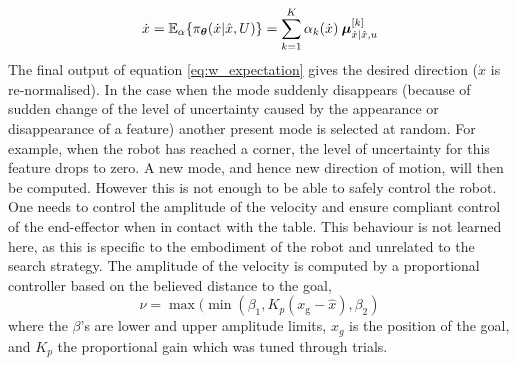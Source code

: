 \begin{equation}\label{eq:w_expectation}
 \dot{x} = \mathbb{E}_{\alpha}\{\pi_{\boldsymbol{\theta}}(\dot{x}|\hat{x},U)\} = \sum\limits_{k=1}^{K} \alpha_{k}(\dot{x}) \:\boldsymbol{\mu}^{[k]}_{\dot{x}|\hat{x},u}
\end{equation}
% 
%
The final output of equation \ref{eq:w_expectation} gives the desired direction
($\dot{x}$ is re-normalised). In the case when the mode suddenly disappears
(because of sudden change of the level of uncertainty caused by the appearance or disappearance of a feature)
another present mode is selected at random. For example, when the robot has reached a corner, the level of uncertainty for this feature drops to zero.
A new mode, and hence new direction of motion, will then  be computed.
However this is not enough to be able to safely control the robot.
One needs to control the amplitude of the velocity and ensure compliant control 
of the end-effector when in contact with the table. This behaviour is not learned here, as this is specific to 
the embodiment of the robot and unrelated to the search strategy. The 
amplitude of the velocity is computed by a proportional controller based on the
believed distance to the goal,
\begin{equation}
 \nu = \max(\min(\beta_{1},K_{p}(x_{\mathrm{g}} - \hat{x}),\beta_{2})
\end{equation}
where the $\beta$'s are lower and upper amplitude limits, $x_{g}$ is the
position of the goal, and $K_{p}$ the proportional gain which was tuned through
trials.

%
%

